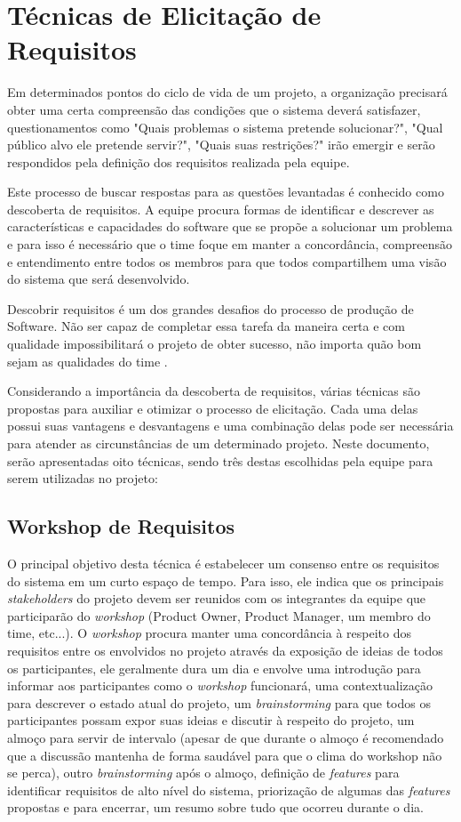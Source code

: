\chapter[Técnicas de Elicitação de Requisitos]{Técnicas de Elicitação de Requisitos}
Em determinados pontos do ciclo de vida de um projeto, a organização precisará obter uma certa compreensão das condições que o sistema deverá satisfazer, questionamentos como "Quais problemas o sistema pretende solucionar?", "Qual público alvo ele pretende servir?", "Quais suas restrições?" irão emergir e serão respondidos pela definição dos requisitos realizada pela equipe.

Este processo de buscar respostas para as questões levantadas é conhecido como descoberta de requisitos. A equipe procura formas de identificar e descrever as características e capacidades do software que se propõe a solucionar um problema e para isso é necessário que o time foque em manter a concordância, compreensão e entendimento entre todos os membros para que todos compartilhem uma visão do sistema que será desenvolvido.

Descobrir requisitos é um dos grandes desafios do processo de produção de Software. Não ser capaz de completar essa tarefa da maneira certa e com qualidade impossibilitará o projeto de obter sucesso, não importa quão bom sejam as qualidades do time \cite[p. 227-228]{safe001}.

Considerando a importância da descoberta de requisitos, várias técnicas são propostas para auxiliar e otimizar o processo de elicitação. Cada uma delas possui suas vantagens e desvantagens e uma combinação delas pode ser necessária para atender as circunstâncias de um determinado projeto. Neste documento, serão apresentadas oito técnicas, sendo três destas escolhidas pela equipe para serem utilizadas no projeto:

\section{Workshop de Requisitos}
O principal objetivo desta técnica é estabelecer um consenso entre os requisitos do sistema em um curto espaço de tempo. Para isso, ele indica que os principais \emph{stakeholders} do projeto devem ser reunidos com os integrantes da equipe que participarão do \emph{workshop} (Product Owner, Product Manager, um membro do time, etc...). O \emph{workshop} procura manter uma concordância à respeito dos requisitos entre os envolvidos no projeto através da exposição de ideias de todos os participantes, ele geralmente dura um dia e envolve uma introdução para informar aos participantes como o \emph{workshop} funcionará, uma contextualização para descrever o estado atual do projeto, um \emph{brainstorming} para que todos os participantes possam expor suas ideias e discutir à respeito do projeto, um almoço para servir de intervalo (apesar de que durante o almoço é recomendado que a discussão mantenha de forma saudável para que o clima do workshop não se perca), outro \emph{brainstorming} após o almoço, definição de \emph{features} para identificar requisitos de alto nível do sistema, priorização de algumas das \emph{features} propostas e para encerrar, um resumo sobre tudo que ocorreu durante o dia.

